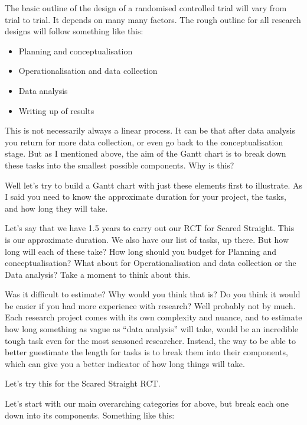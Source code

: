 \documentclass[]{book}
\providecommand{\tightlist}{%
  \setlength{\itemsep}{0pt}\setlength{\parskip}{0pt}}
\theoremstyle{definition}
\theoremstyle{definition}
\theoremstyle{definition}
\theoremstyle{remark}
\begin{document}
The basic outline of the design of a randomised controlled trial will
vary from trial to trial. It depends on many many factors. The rough
outline for all research designs will follow something like this:

\begin{itemize}
\tightlist
\item
  Planning and conceptualisation
\item
  Operationalisation and data collection
\item
  Data analysis
\item
  Writing up of results
\end{itemize}

This is not necessarily always a linear process. It can be that after
data analysis you return for more data collection, or even go back to
the conceptualisation stage. But as I mentioned above, the aim of the
Gantt chart is to break down these tasks into the smallest possible
components. Why is this?

Well let's try to build a Gantt chart with just these elements first to
illustrate. As I said you need to know the approximate duration for your
project, the tasks, and how long they will take.

Let's say that we have 1.5 years to carry out our RCT for Scared
Straight. This is our approximate duration. We also have our list of
tasks, up there. But how long will each of these take? How long should
you budget for Planning and conceptualisation? What about for
Operationalisation and data collection or the Data analysis? Take a
moment to think about this.

Was it difficult to estimate? Why would you think that is? Do you think
it would be easier if you had more experience with research? Well
probably not by much. Each research project comes with its own
complexity and nuance, and to estimate how long something as vague as
``data analysis'' will take, would be an incredible tough task even for
the most seasoned researcher. Instead, the way to be able to better
guestimate the length for tasks is to break them into their components,
which can give you a better indicator of how long things will take.

 Let's try this for the Scared Straight RCT.

Let's start with our main overarching categories for above, but break
each one down into its components. Something like this:
\end{document}
